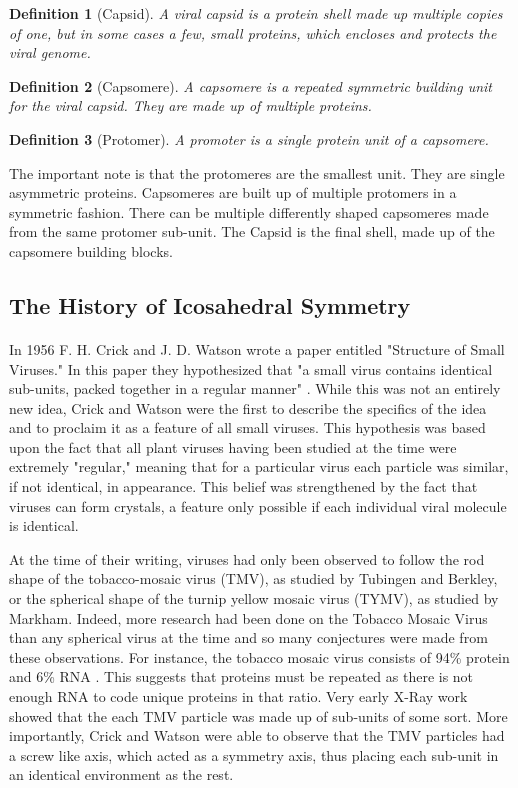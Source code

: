 \documentclass[12pt,letter]{article}
\newtheorem*{definition*}{Definition}
\begin{document}
\begin{definition*}[Capsid]
A viral capsid is a protein shell made up multiple copies of one, but in some cases a few, small proteins, which encloses and protects the viral genome.
\end{definition*}
\begin{definition*}[Capsomere]
A capsomere is a repeated symmetric building unit for the viral capsid. They are made up of multiple proteins.
\end{definition*}
\begin{definition*}[Protomer]
A promoter is a single protein unit of a capsomere.
\end{definition*}

The important note is that the protomeres are the smallest unit. They are single asymmetric proteins. Capsomeres are built up of multiple protomers in a symmetric fashion. There can be multiple differently shaped capsomeres made from the same protomer sub-unit. The Capsid is the final shell, made up of the capsomere building blocks.

\subsection{The History of Icosahedral Symmetry} %

\paragraph{}
In 1956  F. H. Crick and J. D. Watson wrote a paper entitled "Structure of Small Viruses." In this paper they hypothesized that "a small virus contains identical sub-units, packed together in a regular manner" \cite[p 473]{Crick:1956}. While this was not an entirely new idea, Crick and Watson were the first to describe the specifics of the idea and to proclaim it as a feature of all small viruses. This hypothesis was based upon the fact that all plant viruses having been studied at the time were extremely "regular," meaning that for a particular virus each particle was similar, if not identical, in appearance. This belief was strengthened by the fact that viruses can form crystals, a feature only possible if each individual viral molecule is identical.

At the time of their writing, viruses had only been observed to follow the rod shape of the tobacco-mosaic virus (TMV), as studied by Tubingen and Berkley, or the spherical shape of the turnip yellow mosaic virus (TYMV), as studied by Markham. Indeed, more research had been done on the Tobacco Mosaic Virus than any spherical virus at the time and so many conjectures were made from these observations. For instance, the tobacco mosaic virus consists of 94\% protein and 6\% RNA \cite[p 473]{Crick:1956}. This suggests that proteins must be repeated as there is not enough RNA to code unique proteins in that ratio. Very early X-Ray work showed that the each TMV particle was made up of sub-units of some sort. More importantly, Crick and Watson were able to observe that the TMV particles had a screw like axis, which acted as a symmetry axis, thus placing each sub-unit in an identical environment as the rest.
\end{document}
